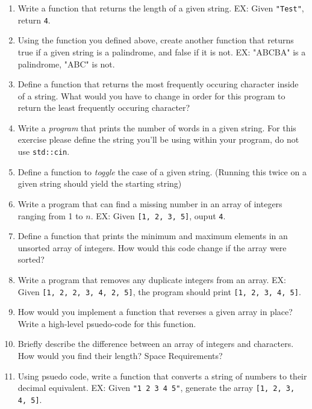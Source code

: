 \documentclass[11pt]{article}
\begin{document}
\begin{enumerate}[leftmargin=*]

\item Write a function that returns the length of a given string. EX: Given \verb|"Test"|, return \verb|4|.

\item Using the function you defined above, create another function that returns true if a given string is a palindrome, and false if it is not. EX: "ABCBA" is a palindrome, "ABC" is not.

\item Define a function that returns the most frequently occuring character inside of a string. What would you have to change in order for this program to return the least frequently occuring character? 

\item Write a \textit{program} that prints the number of words in a given string. For this exercise please define the string you'll be using within your program, do not use \verb|std::cin|.

\item Define a function to \textit{toggle} the case of a given string. (Running this twice on a given string should yield the starting string)

\item Write a program that can find a missing number in an array of integers ranging from 1 to $n$. EX: Given \verb|[1, 2, 3, 5]|, ouput \verb|4|. 

\item Define a function that prints the minimum and maximum elements in an unsorted array of integers. How would this code change if the array were sorted?

\item Write a program that removes any duplicate integers from an array. EX: Given \verb|[1, 2, 2, 3, 4, 2, 5]|, the program should print \verb|[1, 2, 3, 4, 5]|.

\item How would you implement a function that reverses a given array in place? Write a high-level psuedo-code for this function.

%
\item Briefly describe the difference between an array of integers and characters. How would you find their length? Space Requirements?

%
\item Using psuedo code, write a function that converts a string of numbers to their decimal equivalent. EX: Given \verb|"1 2 3 4 5"|, generate the array \verb|[1, 2, 3, 4, 5]|.

\end{enumerate}

\label{r:lastpage}
\end{document}
